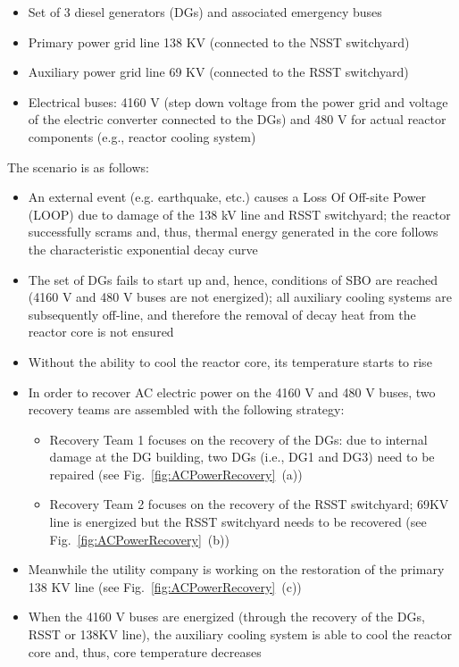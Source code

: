 \begin{itemize}
\item Set of 3 diesel generators (DGs) and associated emergency buses
\item Primary power grid line 138 KV (connected to the NSST switchyard)
\item Auxiliary power grid line 69 KV (connected to the RSST switchyard)
\item Electrical buses: 4160 V (step down voltage from the power grid and voltage of the electric converter connected to the DGs) and 480 V for actual reactor components (e.g., reactor cooling system)
\end{itemize}
The scenario is as follows:
\begin{itemize}
\item An external event (e.g. earthquake, etc.) causes a Loss Of Off-site Power (LOOP) due to damage of the 138 kV line and RSST switchyard; the reactor successfully scrams and, thus, thermal energy generated in the core follows the characteristic exponential decay curve
\item The set of DGs fails to start up and, hence, conditions of SBO are reached (4160 V and 480 V buses are not energized); all auxiliary cooling systems are subsequently off-line, and therefore the removal of decay heat from the reactor core is not ensured
\item Without the ability to cool the reactor core, its temperature starts to rise
\item In order to recover AC electric power on the 4160 V and 480 V buses, two recovery teams are assembled with the following strategy:
\begin{itemize}
\item Recovery Team 1 focuses on the recovery of the DGs: due to internal damage at the DG building, two DGs (i.e., DG1 and DG3) need to be repaired (see Fig.~\ref{fig:ACPowerRecovery}~(a))
\item Recovery Team 2 focuses on the recovery of the RSST switchyard; 69KV line is energized but the RSST switchyard needs to be recovered (see Fig.~\ref{fig:ACPowerRecovery}~(b))
\end{itemize}
\item Meanwhile the utility company is working on the restoration of the primary 138 KV line (see Fig.~\ref{fig:ACPowerRecovery}~(c))
\item When the 4160 V buses are energized (through the recovery of the DGs, RSST or 138KV line), the auxiliary cooling system is able to cool the reactor core and, thus, core temperature decreases
\end{itemize}

